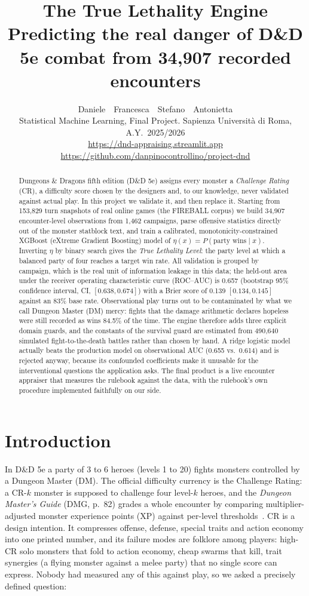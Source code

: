 \documentclass[10pt]{article}
\title{\color{sapienzaRed}\textbf{The True Lethality Engine}\\
\large\color{black} Predicting the real danger of D\&D 5e combat from 34{,}907 recorded encounters}
\author{Daniele \,\textperiodcentered\, Francesca \,\textperiodcentered\, Stefano \,\textperiodcentered\, Antonietta\\[2pt]
\small Statistical Machine Learning, Final Project. Sapienza Università di Roma, A.Y.~2025/2026\\
\small \url{https://dnd-appraising.streamlit.app} \quad
\url{https://github.com/danpinocontrollino/project-dnd}}
\date{}
\begin{document}
\maketitle

\begin{abstract}
\noindent
Dungeons \& Dragons fifth edition (D\&D 5e) assigns every monster a \emph{Challenge Rating} (CR), a
difficulty score chosen by the designers and, to our knowledge, never validated
against actual play. In this project we validate it, and then replace it. Starting
from 153{,}829 turn snapshots of real online games (the FIREBALL corpus) we build
34{,}907 encounter-level observations from 1{,}462 campaigns, parse offensive
statistics directly out of the monster statblock text, and train a calibrated,
monotonicity-constrained XGBoost (eXtreme Gradient Boosting) model of $\eta(x)=P(\text{party wins}\mid x)$.
Inverting $\eta$ by binary search gives the \emph{True Lethality Level}: the party
level at which a balanced party of four reaches a target win rate. All validation is
grouped by campaign, which is the real unit of information leakage in this data; the
held-out area under the receiver operating characteristic curve (ROC--AUC) is 0.657 (bootstrap 95\% confidence interval, CI, $[0.638, 0.674]$) with a Brier score of
0.139 $[0.134, 0.145]$ against an 83\% base rate. Observational play turns out to be
contaminated by what we call Dungeon Master (DM) mercy: fights that the damage arithmetic declares
hopeless were still recorded as wins 84.5\% of the time. The engine therefore adds
three explicit domain guards, and the constants of the survival guard are estimated
from 490{,}640 simulated fight-to-the-death battles rather than chosen by hand. A
ridge logistic model actually beats the production model on observational AUC (0.655
vs.\ 0.614) and is rejected anyway, because its confounded coefficients make it
unusable for the interventional questions the application asks. The final product is
a live encounter appraiser that measures the rulebook against the data, with the
rulebook's own procedure implemented faithfully on our side.
\end{abstract}

\section{Introduction}
In D\&D 5e a party of 3 to 6 heroes (levels 1 to 20) fights monsters controlled by a
Dungeon Master (DM). The official difficulty currency is the Challenge Rating: a
CR-$k$ monster is supposed to challenge four level-$k$ heroes, and the \emph{Dungeon
Master's Guide} (DMG, p.~82) grades a whole encounter by comparing
multiplier-adjusted monster experience points (XP) against per-level thresholds~\cite{dmg}. CR is a
design intention. It compresses offense, defense, special traits and action economy
into one printed number, and its failure modes are folklore among players: high-CR
solo monsters that fold to action economy, cheap swarms that kill, trait synergies
(a flying monster against a melee party) that no single score can express. Nobody
had measured any of this against play, so we asked a precisely defined question:
\end{document}
